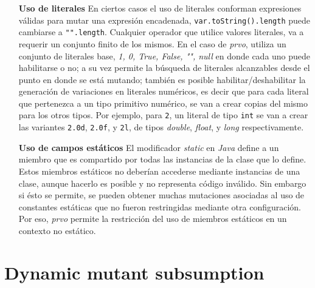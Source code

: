 \begin{enumerate}[leftmargin=.75cm,align=left]
	\item[\textbf{Uso de literales}] En ciertos casos el uso de literales conforman expresiones v\'alidas para mutar una expresi\'on encadenada, \lstinline|var.toString().length| puede cambiarse a \lstinline|"".length|. Cualquier operador que utilice valores literales, va a requerir un conjunto finito de los mismos. En el caso de \emph{prvo}, utiliza un conjunto de literales base, \emph{1, 0, True, False, "", null} en donde cada uno puede habilitarse o no; a su vez permite la b\'usqueda de literales alcanzables desde el punto en donde se est\'a mutando; tambi\'en es posible habilitar/deshabilitar la generaci\'on de variaciones en literales num\'ericos, es decir que para cada literal que pertenezca a un tipo primitivo num\'erico, se van a crear copias del mismo para los otros tipos. Por ejemplo, para \texttt{2}, un literal de tipo \texttt{int} se van a crear las variantes \texttt{2.0d}, \texttt{2.0f}, y \texttt{2l}, de tipos \emph{double}, \emph{float}, y \emph{long} respectivamente.
	
	\item[\textbf{Uso de campos est\'aticos}] El modificador \emph{static} en \emph{Java} define a un miembro que es compartido por todas las instancias de la clase que lo define. Estos miembros est\'aticos no deber\'ian accederse mediante instancias de una clase, aunque hacerlo es posible y no representa c\'odigo inv\'alido. Sin embargo si \'esto se permite, se pueden obtener muchas mutaciones asociadas al uso de constantes est\'aticas que no fueron restringidas mediante otra configuraci\'on. Por eso, \emph{prvo} permite la restricci\'on del uso de miembros est\'aticos en un contexto no est\'atico.
\end{enumerate}

\section{Dynamic mutant subsumption}
\label{sec:implementation.dynamicSubsumption}

